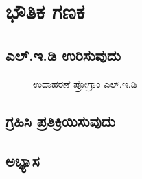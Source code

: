
\chapter{ಭೌತಿಕ ಗಣಕ}

\section{ಎಲ್.ಇ.ಡಿ ಉರಿಸುವುದು}
\begin{figure}[h]
\caption{ಉದಾಹರಣೆ ಪ್ರೋಗ್ರಾಂ ಎಲ್.ಇ.ಡಿ}
\end{figure}

\section{ಗ್ರಹಿಸಿ ಪ್ರತಿಕ್ರಿಯಿಸುವುದು} 
\SampleProgram

\section{ಅಭ್ಯಾಸ }
